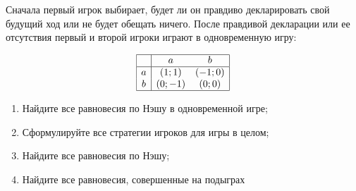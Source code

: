 \begin{problem}[Обещания]
Сначала первый игрок выбирает, будет ли он правдиво декларировать свой будущий ход или не будет обещать ничего. После правдивой декларации или ее отсутствия первый и второй игроки играют в одновременную игру:\par
\[\begin{array}{|c|cc|}  \hline {} & {a} & {b} \\  \hline {a} & {\left(1;1\right)} & {\left(-1;0\right)} \\ {b} & {\left(0;-1\right)} & {\left(0;0\right)} \\  \hline  \end{array}\]
\begin{enumerate}
\item  Найдите все равновесия по Нэшу в одновременной игре;\par
\item Сформулируйте все стратегии игроков для игры в целом;\par
\item  Найдите все равновесия по Нэшу;\par
\item Найдите все равновесия, совершенные на подыграх\par
\end{enumerate}


\begin{sol}

\end{sol}
\end{problem}



